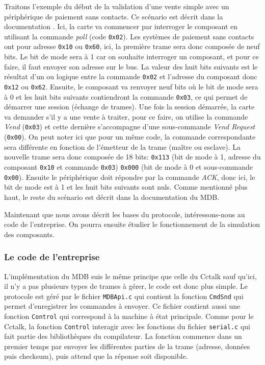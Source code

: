 \documentclass[a4paper]{article}
\begin{document}
Traitons l'exemple du début de la validation d'une vente simple avec un
périphérique de paiement sans contacts. Ce scénario est décrit dans la
documentation \cite[p.~169]{mdbdoc}. Ici, la carte va commencer par interroger
le composant en utilisant la commande \textit{poll} (code \verb|0x02|). Les
systèmes de paiement sans contacts ont pour adresse \verb|0x10| ou \verb|0x60|,
ici, la première trame sera donc composée de neuf bits. Le bit de mode sera à 1
car on souhaite interroger un composant, et pour ce faire, il faut envoyer son
adresse sur le bus. La valeur des huit bits suivants est le résultat d'un ou
logique entre la commande \verb|0x02| et l'adresse du composant donc \verb|0x12|
ou \verb|0x62|. Ensuite, le composant va renvoyer neuf bits où le bit de mode
sera à 0 et les huit bits suivants contiendront la commande \verb|0x03|, ce qui
permet de démarrer une session (échange de trames). Une fois la session
démarrée, la carte va demander s'il y a une vente à traiter, pour ce faire, on
utilise la commande \textit{Vend} (\verb|0x03|) et cette dernière s'accompagne
d'une sous-commande \textit{Vend Request} (\verb|0x00|). On peut noter ici que
pour un même code, la commande correspondante sera différente en fonction de
l'émetteur de la trame (maître ou esclave). La nouvelle trame sera donc composée
de 18 bits: \verb|0x113| (bit de mode à 1, adresse du composant \verb|0x10| et
commande \verb|0x03|) \verb|0x000| (bit de mode à 0 et sous-commande
\verb|0x00|). Ensuite le périphérique doit répondre par la commande
\textit{ACK}, donc ici, le bit de mode est à 1 et les huit bits suivants sont
nuls. Comme mentionné plus haut, le reste du scénario est décrit dans la
documentation du MDB.

Maintenant que nous avons décrit les bases du protocole, intéressons-nous au
code de l'entreprise. On pourra ensuite étudier le fonctionnement de la
simulation des composants.

\subsubsection{Le code de l'entreprise}

L'implémentation du MDB suis le même principe que celle du Cctalk sauf qu'ici,
il n'y a pas plusieurs types de trames à gérer, le code est donc plus simple. Le
protocole est géré par le fichier \verb|MDBApi.c| qui contient la fonction
\verb|CmdSnd| qui permet d'enregistrer les commandes à envoyer. Ce fichier
contient aussi une fonction \verb|Control| qui correspond à la machine à état
principale. Comme pour le Cctalk, la fonction \verb|Control| interagir avec les
fonctions du fichier \verb|serial.c| qui fait partie des bibliothèques du
compilateur. La fonction commence dans un premier temps par envoyer les
différentes parties de la trame (adresse, données puis checksum), puis attend
que la réponse soit disponible.
\end{document}

